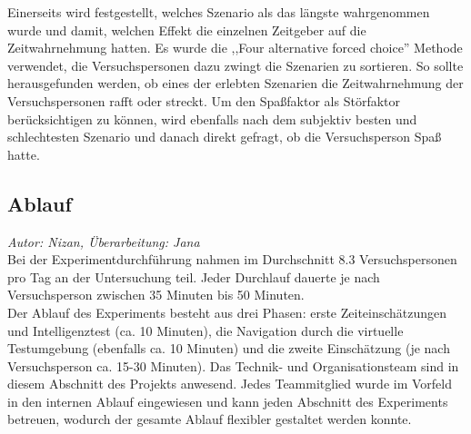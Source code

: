 \documentclass{Bericht}
\begin{document}
Einerseits wird festgestellt, welches Szenario als das längste wahrgenommen wurde und damit, welchen Effekt die einzelnen Zeitgeber auf die Zeitwahrnehmung hatten. 
Es wurde die ,,Four alternative forced choice'' Methode verwendet, die Versuchspersonen dazu zwingt die Szenarien zu sortieren. So sollte herausgefunden werden, ob eines der erlebten Szenarien die Zeitwahrnehmung der Versuchspersonen rafft oder streckt.	
Um den Spaßfaktor als Störfaktor berücksichtigen zu können, wird ebenfalls nach dem subjektiv besten und schlechtesten Szenario und danach direkt gefragt, ob die Versuchsperson Spaß hatte.

\subsection{Ablauf}
\textit{Autor: Nizan, Überarbeitung: Jana}\\
Bei der Experimentdurchführung nahmen im Durchschnitt 8.3 Versuchspersonen pro Tag an der Untersuchung teil. Jeder Durchlauf dauerte je nach Versuchsperson zwischen 35 Minuten bis 50 Minuten.\\
Der Ablauf des Experiments besteht aus drei Phasen: erste Zeiteinschätzungen und Intelligenztest (ca. 10 Minuten), die Navigation durch die virtuelle Testumgebung (ebenfalls ca. 10 Minuten) und die zweite Einschätzung (je nach Versuchsperson ca. 15-30 Minuten). Das Technik- und Organisationsteam sind in diesem Abschnitt des Projekts anwesend. Jedes Teammitglied wurde im Vorfeld in den internen Ablauf eingewiesen und kann jeden Abschnitt des Experiments betreuen, wodurch der gesamte Ablauf flexibler gestaltet werden konnte.\\ 
\end{document}
